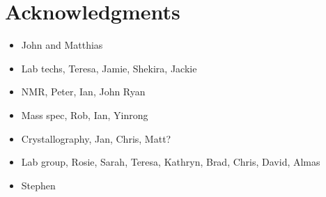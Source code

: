 
\chapter*{Acknowledgments}
\label{ch:acknowledgments}

\begin{itemize}
\item{John and Matthias}
\item{Lab techs, Teresa, Jamie, Shekira, Jackie}
\item{NMR, Peter, Ian, John Ryan}
\item{Mass spec, Rob, Ian, Yinrong}
\item{Crystallography, Jan, Chris, Matt?}
\item{Lab group, Rosie, Sarah, Teresa, Kathryn, Brad, Chris, David, Almas}
\item{Stephen}
\end{itemize}